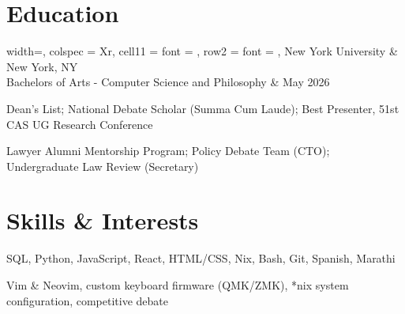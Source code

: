\documentclass[10pt]{article}
\begin{document}
\section{Education}
\vspace{-0.5em}
\titlerule
\vspace{0.5em}

\begin{tblr}{
    width=\textwidth,
    colspec = {Xr},
    cell{1}{1} = {font = {\bfseries}},
    row{2} = {font = {\itshape}},
  }
  New York University                                 & New York, NY \\
  Bachelors of Arts - Computer Science and Philosophy & May 2026     \\
\end{tblr}
\begin{compactitem}
\item[\bfseries Awards:]
    Dean's List;
    National Debate Scholar (Summa Cum Laude);
    Best Presenter, 51st CAS UG Research Conference

\item[\bfseries Organizations:]
    Lawyer Alumni Mentorship Program; Policy Debate Team
    (CTO); Undergraduate Law Review (Secretary)
\end{compactitem}

\vspace{0.5em}

\section{Skills \& Interests}
\vspace{-0.5em}
\titlerule

\vspace{0.5em}

\begin{compactitem}
\item[\bfseries Skills:]
    SQL,
    Python,
    JavaScript,
    React,
    HTML/CSS,
    Nix,
    Bash,
    Git,
    Spanish,
    Marathi

\item[\bfseries Interests:]
    Vim \& Neovim,
    custom keyboard firmware (QMK/ZMK),
    *nix system configuration,
    competitive debate
\end{compactitem}
\end{document}
